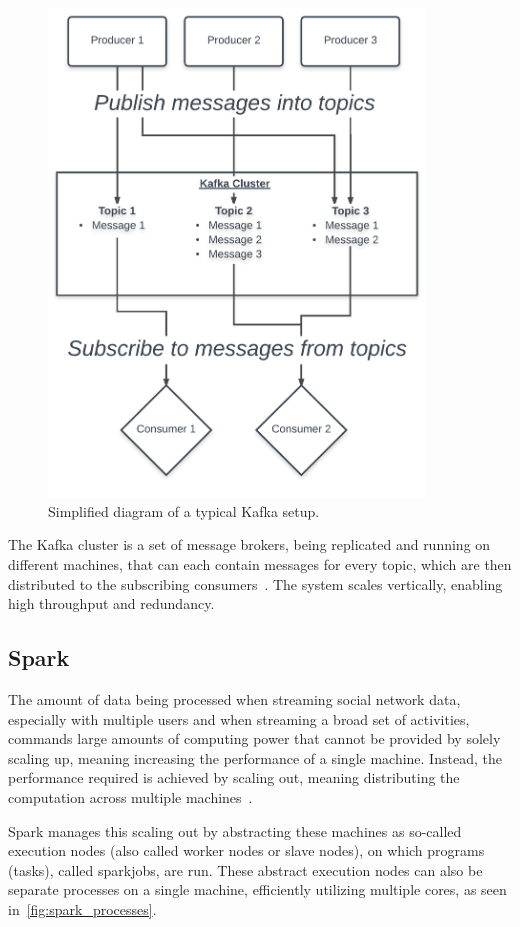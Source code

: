 \begin{figure}
    \centering
    \caption{Simplified diagram of a typical Kafka setup.}
    \label{fig:kafka}
    \includegraphics[width=10cm]{../figures/kafka.pdf}
\end{figure}

The Kafka cluster is a set of message brokers, being replicated and running on different machines, that can each contain messages for every topic,
which are then distributed to the subscribing consumers~\cite{Kreps2015}.
The system scales vertically, enabling high throughput and redundancy.

\subsection{Spark}
\label{subsec:spark}

The amount of data being processed when streaming social network data,
especially with multiple users and when streaming a broad set of activities,
commands large amounts of computing power that cannot be provided by solely scaling up,
meaning increasing the performance of a single machine.
Instead, the performance required is achieved by scaling out,
meaning distributing the computation across multiple machines~\cite{Wolke2010}.

\par %
Spark manages this scaling out by abstracting these machines as so-called execution nodes (also called worker nodes or slave nodes),
on which programs (tasks), called sparkjobs, are run.
These abstract execution nodes can also be separate processes on a single machine,
efficiently utilizing multiple cores, as seen in~\autoref{fig:spark_processes}.

